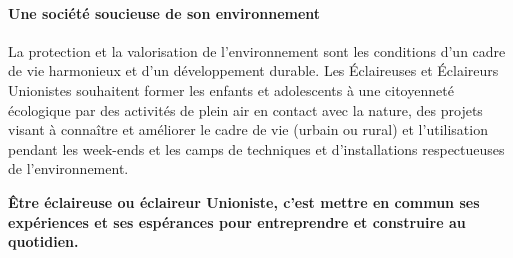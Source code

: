 \documentclass[titlepage,11pt,a4paper]{article}
\begin{document}
\paragraph*{Une société soucieuse de son environnement}
La protection et la valorisation de l'environnement sont les conditions d'un cadre de vie
harmonieux et d'un développement durable. Les Éclaireuses et Éclaireurs Unionistes
souhaitent former les enfants et adolescents à une citoyenneté écologique par des
activités de plein air en contact avec la nature, des projets visant à connaître et
améliorer le cadre de vie (urbain ou rural) et l'utilisation pendant les week-ends et les camps de techniques et d'installations respectueuses de l'environnement.

\textbf{Être éclaireuse ou éclaireur Unioniste, c'est mettre en commun ses expériences et
ses espérances pour entreprendre et construire au quotidien.}
\end{document}

